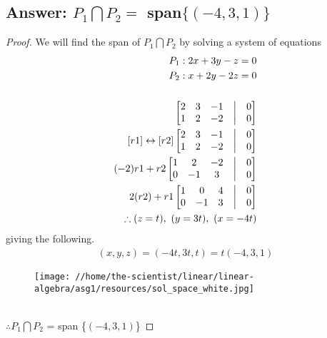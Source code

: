 \documentclass[11pt]{article}
\begin{document}
\subsection{Answer: $P_1 \bigcap P_2 =$ span$\{(-4, 3, 1)\}$}
\begin{proof}
        We will find the span of $P_1 \bigcap P_2$ by solving a system of equations
        \begin{align*}
                P_{1}: 2x+3y-z = 0         \\
                P_{2}: x+2y-2z = 0         \\\\
                \begin{bmatrix}
                        2 & 3 & -1 & \bigm| & 0 \\
                        1 & 2 & -2 & \bigm| & 0 \\
                \end{bmatrix}
                \\
                [r1] \leftrightarrow  [r2]
                \begin{bmatrix}
                        2 & 3 & -1 & \bigm| & 0 \\
                        1 & 2 & -2 & \bigm| & 0 \\
                \end{bmatrix}
                \\
                (-2)r1+r2
                \begin{bmatrix}
                        1 & 2  & -2 & \bigm| & 0 \\
                        0 & -1 & 3  & \bigm| & 0 \\
                \end{bmatrix}
                \\
                2(r2)+r1
                \begin{bmatrix}
                        1 & 0  & 4 & \bigm| & 0 \\
                        0 & -1 & 3 & \bigm| & 0 \\
                \end{bmatrix} \\
                \therefore (z=t),\ (y=3t),\ (x=-4t)
        \end{align*}
        giving the following.
        \begin{align*}
                (x,y,z) = (-4t, 3t, t) = t(-4, 3, 1)
        \end{align*}
        \begin{figure}[htbp]
                \centering
                \texttt{[image: //home/the-scientist/linear/linear-algebra/asg1/resources/sol\_space\_white.jpg]}
        \end{figure}
        \\$\therefore P_1 \bigcap P_2$ = span \{$(-4, 3, 1)$\}
\end{proof}
\end{document}
